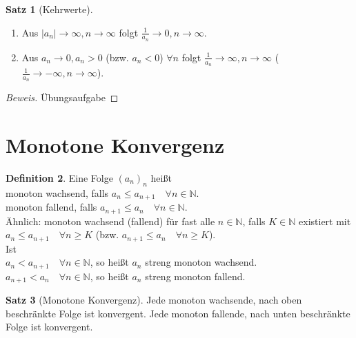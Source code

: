 \documentclass[12pt,a4paper,titlepage]{article} %
\theoremstyle{definition}
\newtheorem{satz}{Satz}[subsection]
\newtheorem{defi}[satz]{Definition}
\theoremstyle{remark}
\newenvironment{bew}{\begin{proof}[Beweis]}{\end{proof}}
\newcommand{\N}{\mathbb{N}}
\begin{document}
\begin{satz}[Kehrwerte]
	\begin{enumerate}
		\item Aus \( |a_n| \rightarrow \infty, n\rightarrow\infty \) folgt \(\frac{1}{a_n} \rightarrow0,n\rightarrow\infty \).
		\item Aus \( a_n\rightarrow 0, a_n > 0 \) (bzw. \(a_n<0\)) \( \forall n \) folgt \( \frac{1}{a_n} \rightarrow\infty, n\rightarrow\infty \) (\( \frac{1}{a_n} \rightarrow -\infty, n\rightarrow\infty \)).
	\end{enumerate}
\end{satz}
\begin{bew}
	Übungsaufgabe
\end{bew}
\section{Monotone Konvergenz}
\begin{defi}
	Eine Folge \((a_n)_n\) heißt \\monoton wachsend, falls \(a_n\leq a_{n+1} \quad \forall n\in\N \).\\monoton fallend, falls \(a_{n+1} \leq a_n \quad\forall n\in\N \).\\
	Ähnlich: monoton wachsend (fallend) für fast alle \(n\in\N\), falls \( K\in\N \) existiert mit \( a_n\leq a_{n+1} \quad \forall n\geq K \) (bzw. \(a_{n+1}\leq a_n \quad \forall n\geq K \)).\\
	Ist \\\( a_n<a_{n+1} \quad \forall n\in\N \), so heißt \(a_n\) streng monoton wachsend.\\
	\( a_{n+1}<a_n \quad \forall n\in\N \), so heißt \(a_n\) streng monoton fallend.
\end{defi}
\begin{satz}[Monotone Konvergenz]
	Jede monoton wachsende, nach oben beschränkte Folge ist konvergent. Jede monoton fallende, nach unten beschränkte Folge ist konvergent.
\end{satz}
\end{document}
